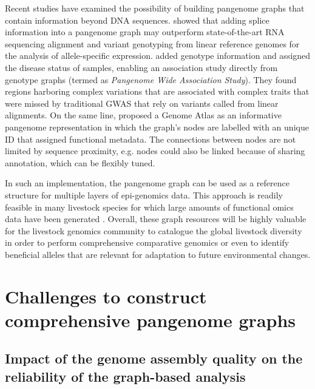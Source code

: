 \documentclass[../main.tex]{subfiles}
\begin{document}
Recent studies have examined the possibility of building pangenome graphs that contain information beyond DNA sequences. \citet{Sibbesen2021} showed that adding splice information into a pangenome graph may outperform state-of-the-art RNA sequencing alignment and variant genotyping from linear reference genomes for the analysis of allele-specific expression. \citet{Hokin2020} added genotype information and assigned the disease status of samples, enabling an association study directly from genotype graphs (termed as \emph{Pangenome Wide Association Study}). They found regions harboring complex variations that are associated with complex traits that were missed by traditional GWAS that rely on variants called from linear alignments. On the same line, \citet{kaye2021genome} proposed a Genome Atlas as an informative pangenome representation in which the graph’s nodes are labelled with an unique ID that assigned functional metadata. The connections between nodes are not limited by sequence proximity, e.g. nodes could also be linked because of sharing annotation, which can be flexibly tuned. 

In such an implementation, the pangenome graph can be used as a reference structure for multiple layers of epi-genomics data. This approach is readily feasible in many livestock species for which large amounts of functional omics data have been generated \citep{clark2020faang}. Overall, these graph resources will be highly valuable for the livestock genomics community to catalogue the global livestock diversity in order to perform comprehensive comparative genomics or even to identify beneficial alleles that are relevant for adaptation to future environmental changes.  

\section{Challenges to construct comprehensive pangenome graphs}

\subsection*{Impact of the genome assembly quality on the reliability of the graph-based analysis}
\end{document}
